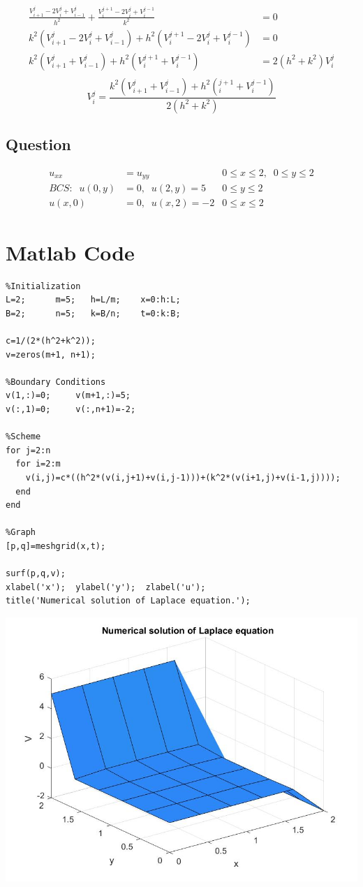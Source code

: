\begin{align*}
  \frac{V_{i+1}^j-2V_i^j+V_{i-1}^j}{h^2} + \frac{V_i^{j+1}-2V_i^j+V_i^{j-1}}{k^2} &= 0\\
  k^2(V_{i+1}^j-2V_i^j+V_{i-1}^j) + h^2(V_i^{j+1}-2V_i^j+V_i^{j-1}) &= 0\\
  k^2(V_{i+1}^j+V_{i-1}^j) + h^2(V_i^{j+1}+V_i^{j-1}) &= 2(h^2+k^2)V_i^j\\
\end{align*}
\begin{equation}
  V_i^j = \frac{k^2(V_{i+1}^j+V_{i-1}^j)+h^2(_i^{j+1}+V_i^{j-1})}{2(h^2+k^2)}
\end{equation}

\subsection{Question}
\begin{align*}
    u_{xx}&=u_{yy}           &   0\leq x \leq 2,\;\; 0 \leq y \leq 2\\
    BCS:\;\; u(0,y)&=0, \;\; u(2,y)=5   &   0\leq y \leq 2\\
             u(x,0)&=0, \;\; u(x,2)=-2  &   0\leq x \leq 2
\end{align*}
\clearpage

\section{Matlab Code}
\begin{verbatim}
%Initialization
L=2;      m=5;   h=L/m;    x=0:h:L;
B=2;      n=5;   k=B/n;    t=0:k:B;

c=1/(2*(h^2+k^2));
v=zeros(m+1, n+1);

%Boundary Conditions
v(1,:)=0;     v(m+1,:)=5;
v(:,1)=0;     v(:,n+1)=-2;

%Scheme
for j=2:n
  for i=2:m
    v(i,j)=c*((h^2*(v(i,j+1)+v(i,j-1)))+(k^2*(v(i+1,j)+v(i-1,j))));
  end
end

%Graph
[p,q]=meshgrid(x,t);

surf(p,q,v);
xlabel('x');  ylabel('y');  zlabel('u');
title('Numerical solution of Laplace equation.');
\end{verbatim}
\includegraphics[scale=0.32]{laplace.jpg}

